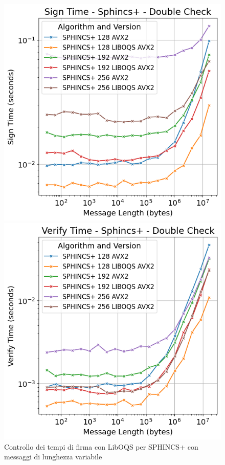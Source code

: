 \begin{figure}[H]
    \centering
    \begin{minipage}{0.45\textwidth}
        \centering
        \includegraphics[width=1\textwidth]{Immagini/20240822_i9/Time_Sign/double_check/TM_SG_sphincs.png}
        \caption{Controllo dei tempi di firma con LibOQS per SPHINCS+ con messaggi di lunghezza variabile}
        \label{fig:TM_SG_sphincs}
    \end{minipage}\hfill
    \begin{minipage}{0.45\textwidth}
        \centering
        \includegraphics[width=1\textwidth]{Immagini/20240822_i9/Time_Verify/double_check/TM_VF_sphincs.png}

\end{minipage}
\end{figure}
